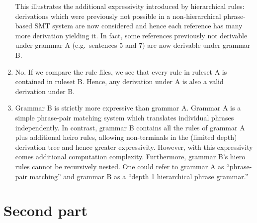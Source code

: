 \documentclass[a4paper,oneside,reqno]{amsart}
\begin{document}
\begin{enumerate}[label=\arabic*.]
    This illustrates the additional expressivity introduced by hierarchical
    rules: derivations which were previously not possible in a non-hierarchical
    phrase-based SMT system are now considered and hence each reference has
    many more derivation yielding it. In fact, some references previously not
    derivable under grammar A (e.g.\ sentences 5 and 7) are now derivable under
    grammar B.

  \item No. If we compare the rule files, we see that every rule in ruleset A is
    contained in ruleset B. Hence, any derivation under A is also a valid derivation under
    B.

  \item Grammar B is strictly more expressive than grammar A. Grammar A is a
    simple phrase-pair matching system which translates individual phrases
    independently. In contrast, grammar B contains all the rules of grammar A
    plus additional heiro rules, allowing non-terminals in the (limited depth)
    derivation tree and hence greater expressivity. However, with this
    expressivity comes additional computation complexity. Furthermore, grammar
    B's hiero rules cannot be recursively nested. One could refer to grammar A
    as ``phrase-pair matching'' and grammar B as a ``depth 1 hierarchical
    phrase grammar.''
\end{enumerate}

\section{Second part}
\end{document}

